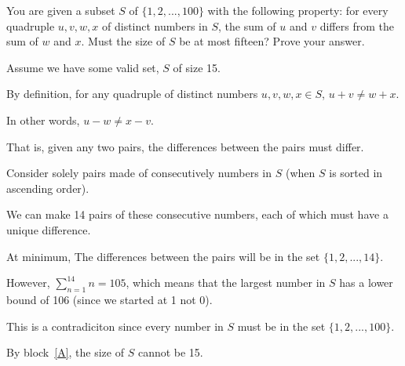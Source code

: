 \documentclass[11pt]{article}
\begin{document}
\begin{problems}


  \newpage

  \problem

  \begin{theorem}
      You are given a subset $S$ of $\{1,2,...,100\}$ with the following property:
        for every quadruple $u,v,w,x$ of distinct numbers in $S$, the sum of $u$ and $v$ 
        differs from the sum of $w$ and $x$.  Must the size of $S$ be at most fifteen?
        Prove your answer.
  \end{theorem}

  \smallskip

  \begin{longFormProof}

    \begin{block}[A]
      {Assume we have some valid set, $S$ of size 15.}

      \step By definition, for any quadruple of distinct numbers $u,v,w,x \in S$, $u + v \neq w + x$.

      \step In other words, $u - w \neq x - v$.

      \step That is, given any two pairs, the differences between the pairs must differ.

      \step Consider solely pairs made of consecutively numbers in $S$ (when $S$ is sorted in ascending order).

      \step We can make 14 pairs of these consecutive numbers, each of which must have a unique difference.

      \step At minimum, The differences between the pairs will be in the set $\{1, 2,..., 14\}$.

      \step However, $\sum_{n=1}^{14} n = 105$, which means that the largest number in $S$ has a lower bound of 106 (since we started at 1 not 0).

      \step This is a contradiciton since every number in $S$ must be in the set $\{1,2,...,100\}$.

    \end{block}

    \step By block~\ref{A}, the size of $S$ cannot be 15.
    
  \end{longFormProof}


\end{problems}
\end{document}
